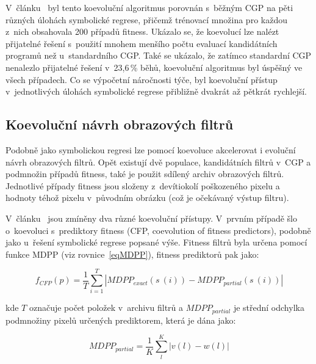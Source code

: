 V~článku~\cite{SikuEuroGP} byl tento koevoluční algoritmus porovnán s~běžným CGP na pěti různých úlohách symbolické regrese, přičemž trénovací množina pro každou z~nich obsahovala 200 případů fitness. Ukázalo se, že koevolucí lze nalézt přijatelné řešení s~použití mnohem menšího počtu evaluací kandidátních programů než u~standardního CGP. Také se ukázalo, že zatímco standardní CGP nenalezlo přijatelné řešení v~23,6\,\% běhů, koevoluční algoritmus byl úspěšný ve všech případech. Co se výpočetní náročnosti týče, byl koevoluční přístup v~jednotlivých úlohách symbolické regrese přibližně dvakrát až pětkrát rychlejší.


\subsection{Koevoluční návrh obrazových filtrů}
\label{secCoevIF}

Podobně jako symbolickou regresi lze pomocí koevoluce akcelerovat i evoluční návrh obrazových filtrů. Opět existují dvě populace, kandidátních filtrů v~CGP a podmnožin případů fitness, také je použit sdílený archiv obrazových filtrů. Jednotlivé případy fitness jsou složeny z~devítiokolí poškozeného pixelu a hodnoty téhož pixelu v~původním obrázku (což je očekávaný výstup filtru).

V~článku~\cite{SikuPPSN} jsou zmíněny dva různé koevoluční přístupy. V~prvním případě šlo o~koevoluci s~prediktory fitness (CFP, coevolution of fitness predictors), podobně jako u~řešení symbolické regrese popsané výše. Fitness filtrů byla určena pomocí funkce MDPP (viz rovnice~\ref{eqMDPP}), fitness prediktorů pak jako:

\begin{equation}
    \label{eqFpredictorIF}
    f_{\mathit{CFP}} \left( p \right) = \frac{1}{T} \sum\limits_{i=1}^{T} \left| \mathit{MDPP_{exact}} \left( s~\left( i \right) \right) - \mathit{MDPP_{partial}} \left( s~\left( i \right) \right) \right|
\end{equation}

\noindent{}kde $T$ označuje počet položek v~archivu filtrů a $\mathit{MDPP_{partial}}$ je střední odchylka podmnožiny pixelů určených prediktorem, která je dána jako:

\begin{equation}
    \label{eqMDPPPartial}
    \mathit{MDPP_{partial}} = \frac{1}{K} \sum\limits_l^K \left| v\left( l \right) - w\left( l \right) \right|
\end{equation}

